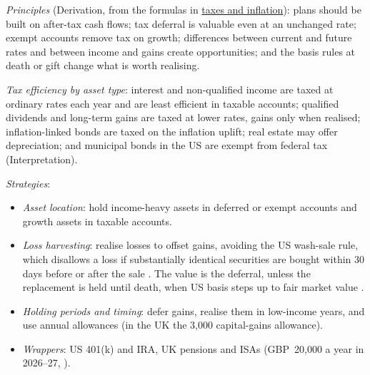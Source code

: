 \begin{qfmethod}\label{meth:tax-in-planning}
 \emph{Principles} (Derivation, from the formulas in \hyperref[meth:private-client-tax-inflation]{taxes and inflation}): plans should be built on after-tax cash flows; tax deferral is valuable even at an unchanged rate; exempt accounts remove tax on growth; differences between current and future rates and between income and gains create opportunities; and the basis rules at death or gift change what is worth realising.

\emph{Tax efficiency by asset type}: interest and non-qualified income are taxed at ordinary rates each year and are least efficient in taxable accounts; qualified dividends and long-term gains are taxed at lower rates, gains only when realised; inflation-linked bonds are taxed on the inflation uplift; real estate may offer depreciation; and municipal bonds in the US are exempt from federal tax (Interpretation).

\emph{Strategies}:
\begin{itemize}
\item \emph{Asset location}: hold income-heavy assets in deferred or exempt accounts and growth assets in taxable accounts.
\item \emph{Loss harvesting}: realise losses to offset gains, avoiding the US wash-sale rule, which disallows a loss if substantially identical securities are bought within 30 days before or after the sale \citep[sec.~1091(a)]{us-internal-revenue-code-26}. The value is the deferral, unless the replacement is held until death, when US basis steps up to fair market value \citep[sec.~1014(a)]{us-internal-revenue-code-26}.
\item \emph{Holding periods and timing}: defer gains, realise them in low-income years, and use annual allowances (in the UK the 3,000 capital-gains allowance).
\item \emph{Wrappers}: US 401(k) and IRA, UK pensions and ISAs (GBP~20,000 a year in 2026--27, \citep[overview]{govuk-isa-2026}).
\end{itemize}


\end{qfmethod}
